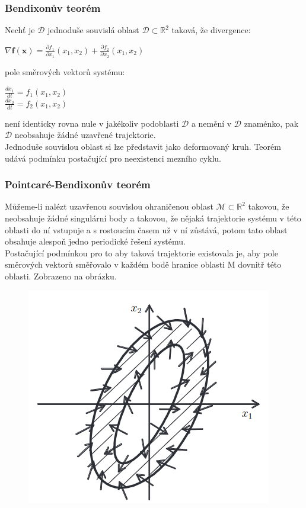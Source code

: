 \subsubsection*{Bendixonův teorém}
Nechť je \(\mathcal{D}\) jednoduše souvislá oblast \(\mathcal{D} \subset \mathbb{R}^2 \) taková, že divergence:
\begin{center}
    \(\nabla \mathbf{f}(\mathbf{x}) = \frac{\partial f_1}{\partial x_1}(x_1,x_2) + \frac{\partial f_2}{\partial x_2}(x_1,x_2)\)
\end{center}
pole směrových vektorů systému:
\begin{center}
    \(\frac{dx_1}{dt} = f_1(x_1,x_2)\)\\
    \(\frac{dx_2}{dt} = f_2(x_1,x_2)\)
\end{center}
není identicky rovna nule v jakékoliv podoblasti \(\mathcal{D}\) a nemění v \(\mathcal{D}\) znaménko, pak \(\mathcal{D}\) neobsahuje žádné uzavřené trajektorie.\\
Jednoduše souvislou oblast si lze představit jako deformovaný kruh. Teorém udává podmínku postačující pro neexistenci mezního cyklu.\\
\subsubsection*{Pointcaré-Bendixonův teorém}
Můžeme-li nalézt uzavřenou souvislou ohraničenou oblast \(\mathcal{M} \subset \mathbb{R}^2\) takovou, že neobsahuje žádné singulární body a takovou, že nějaká trajektorie systému v této oblasti do ní vstupuje a s rostoucím časem už v ní zůstává, potom tato oblast obsahuje alespoň jedno periodické řešení systému.\\
Postačující podmínkou pro to aby taková trajektorie existovala je, aby pole směrových vektorů směřovalo v každém bodě hranice oblasti M dovnitř této oblasti. Zobrazeno na obrázku.\\
\begin{figure}[h!]
    \centering
    \includegraphics[scale = 0.5]{img/PointBendix.png}
\end{figure}

